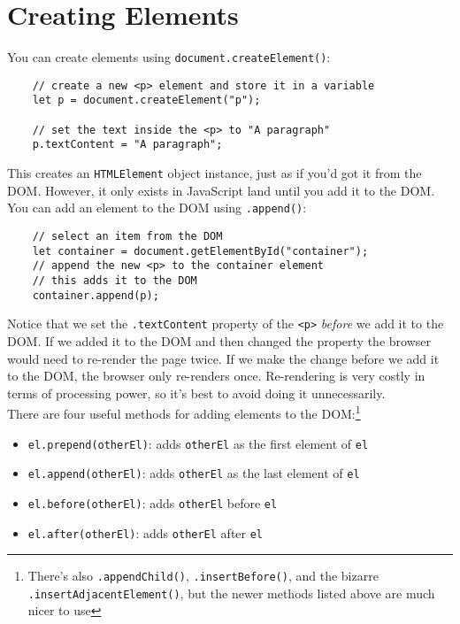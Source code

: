 \section{Creating Elements}

You can create elements using \texttt{document.createElement()}:

\begin{verbatim}
    // create a new <p> element and store it in a variable
    let p = document.createElement("p");

    // set the text inside the <p> to "A paragraph"
    p.textContent = "A paragraph";
\end{verbatim}

This creates an \texttt{HTMLElement} object instance, just as if you'd got it from the DOM. However, it only exists in JavaScript land until you add it to the DOM.
\\

You can add an element to the DOM using \texttt{.append()}:

\begin{verbatim}
    // select an item from the DOM
    let container = document.getElementById("container");
    // append the new <p> to the container element
    // this adds it to the DOM
    container.append(p);
\end{verbatim}

Notice that we set the \texttt{.textContent} property of the \texttt{<p>} \textit{before} we add it to the DOM. If we added it to the DOM and then changed the property the browser would need to re-render the page twice. If we make the change before we add it to the DOM, the browser only re-renders once. Re-rendering is very costly in terms of processing power, so it's best to avoid doing it unnecessarily.
\\

There are four useful methods for adding elements to the DOM:\footnote{There's also \texttt{.appendChild()}, \texttt{.insertBefore()}, and the bizarre \texttt{.insertAdjacentElement()}, but the newer methods listed above are much nicer to use}

\begin{itemize}
    \item \texttt{el.prepend(otherEl)}: adds \texttt{otherEl} as the first element of \texttt{el}
    \item \texttt{el.append(otherEl)}: adds \texttt{otherEl} as the last element of \texttt{el}
    \item \texttt{el.before(otherEl)}: adds \texttt{otherEl} before \texttt{el}
    \item \texttt{el.after(otherEl)}: adds \texttt{otherEl} after \texttt{el}
\end{itemize}


